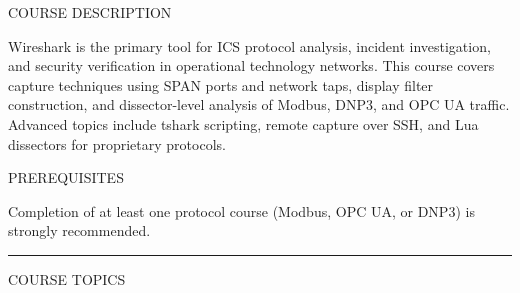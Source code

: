 \documentclass[10pt]{article}
\begin{document}

\vspace{0.70in}

{\small\sffamily\color{wgray}\MakeUppercase{Course Description}}
\smallskip

{\small Wireshark is the primary tool for ICS protocol analysis, incident investigation, and security verification in operational technology networks. This course covers capture techniques using SPAN ports and network taps, display filter construction, and dissector-level analysis of Modbus, DNP3, and OPC UA traffic. Advanced topics include tshark scripting, remote capture over SSH, and Lua dissectors for proprietary protocols.}

\smallskip
{\small\sffamily\color{wgray}\MakeUppercase{Prerequisites}}
\smallskip

{\small Completion of at least one protocol course (Modbus, OPC UA, or DNP3) is strongly recommended.}

\smallskip
{\color{wnavy}\rule{\linewidth}{1.2pt}}
\smallskip
{\small\sffamily\color{wgray}\MakeUppercase{Course Topics}}
\smallskip
\end{document}
